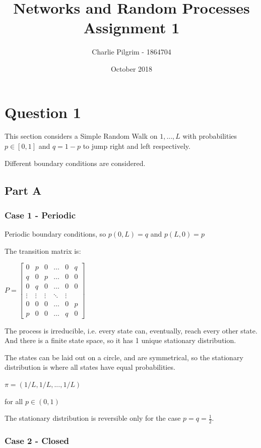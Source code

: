 \documentclass{article}
\title{Networks and Random Processes Assignment 1}
\author{Charlie Pilgrim - 1864704}
\date{October 2018}
\begin{document}
\maketitle


\section{Question 1}



This section considers a Simple Random Walk on ${1,...,L}$ with probabilities $p \in [0,1]$ and $q = 1-p$ to jump right and left respectively. 

Different boundary conditions are considered.

\subsection{Part A}

\subsubsection{Case 1 - Periodic}

Periodic boundary conditions, so $p(0,L) = q$ and $p(L,0) = p$

The transition matrix is:

$P = \begin{bmatrix}
    0 & p & 0 & \dots  & 0 & q \\
    q & 0 & p & \dots  & 0 & 0\\
    0 & q & 0 & \dots  & 0 & 0\\
    \vdots & \vdots & \vdots & \ddots & \vdots \\
    0 & 0 & 0 & \dots & 0 & p \\
    p & 0 & 0 & \dots & q & 0
\end{bmatrix}$

The process is irreducible, i.e. every state can, eventually, reach every other state. And there is a finite state space, so it has 1 unique stationary distribution.

The states can be laid out on a circle, and are symmetrical, so the stationary distribution is where all states have equal probabilities. 

$\pi = (1/L, 1/L,..., 1/L)$

for all $p \in (0,1)$ 

The stationary distribution is reversible only for the case $p=q=\frac{1}{2}$.


\subsubsection{Case 2 - Closed}
\end{document}
